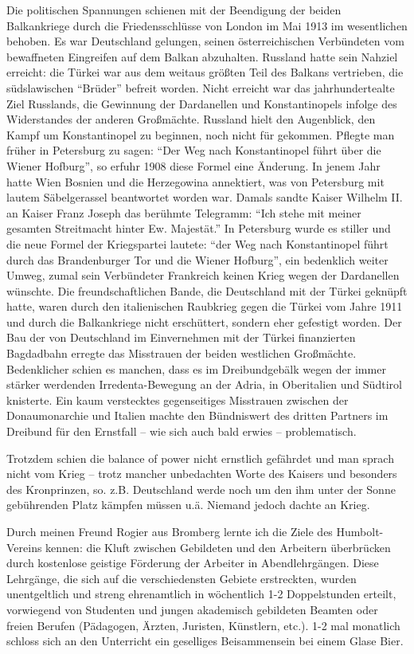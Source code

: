 Die politischen Spannungen schienen mit der Beendigung der beiden Balkankriege durch die Friedensschlüsse von London im Mai 1913 im wesentlichen behoben. Es war Deutschland gelungen, seinen österreichischen Verbündeten vom bewaffneten Eingreifen auf dem Balkan abzuhalten. Russland hatte sein Nahziel erreicht: die Türkei war aus dem weitaus größten Teil des Balkans vertrieben, die südslawischen \enquote{Brüder} befreit worden. Nicht erreicht war das jahrhundertealte Ziel Russlands, die Gewinnung der Dardanellen und Konstantinopels infolge des Widerstandes der anderen Großmächte. Russland hielt den Augenblick, den Kampf um Konstantinopel zu beginnen, noch nicht für gekommen. Pflegte man früher in Petersburg zu sagen: \enquote{Der Weg nach Konstantinopel führt über die Wiener Hofburg}, so erfuhr 1908 diese Formel eine Änderung. In jenem Jahr hatte Wien Bosnien und die Herzegowina annektiert, was von Petersburg mit lautem Säbelgerassel beantwortet worden war. Damals sandte Kaiser Wilhelm II. an Kaiser Franz Joseph das berühmte Telegramm: \enquote{Ich stehe mit meiner gesamten Streitmacht hinter Ew. Majestät.} In Petersburg wurde es stiller und die neue Formel der Kriegspartei lautete: \enquote{der Weg nach Konstantinopel führt durch das Brandenburger Tor und die Wiener Hofburg}, ein bedenklich weiter Umweg, zumal sein Verbündeter Frankreich keinen Krieg wegen der Dardanellen wünschte. Die freundschaftlichen Bande, die Deutschland mit der Türkei geknüpft hatte, waren durch den italienischen Raubkrieg gegen die Türkei vom Jahre 1911 und durch die Balkankriege nicht erschüttert, sondern eher gefestigt worden. Der Bau der von Deutschland im Einvernehmen mit der Türkei finanzierten Bagdadbahn erregte das Misstrauen der beiden westlichen Großmächte. Bedenklicher schien es manchen, dass es im Dreibundgebälk wegen der immer stärker werdenden Irredenta-Bewegung an der Adria, in Oberitalien und Südtirol knisterte. Ein kaum verstecktes gegenseitiges Misstrauen zwischen der Donaumonarchie und Italien machte den Bündniswert des dritten Partners im Dreibund für den Ernstfall -- wie sich auch bald erwies -- problematisch.

Trotzdem schien die balance of power nicht ernstlich gefährdet und man sprach nicht vom Krieg -- trotz mancher unbedachten Worte des Kaisers und besonders des Kronprinzen, so. z.B. Deutschland werde noch um den ihm unter der Sonne gebührenden Platz kämpfen müssen u.ä. Niemand jedoch dachte an Krieg.

Durch meinen Freund Rogier aus Bromberg lernte ich die Ziele des Humbolt-Vereins kennen: die Kluft zwischen Gebildeten und den Arbeitern überbrücken durch kostenlose geistige Förderung der Arbeiter in Abendlehrgängen. Diese Lehrgänge, die sich auf die verschiedensten Gebiete erstreckten, wurden unentgeltlich und streng ehrenamtlich in wöchentlich 1-2 Doppelstunden erteilt, vorwiegend von Studenten und jungen akademisch gebildeten Beamten oder freien Berufen (Pädagogen, Ärzten, Juristen, Künstlern, etc.). 1-2 mal monatlich schloss sich an den Unterricht ein geselliges Beisammensein bei einem Glase Bier.

